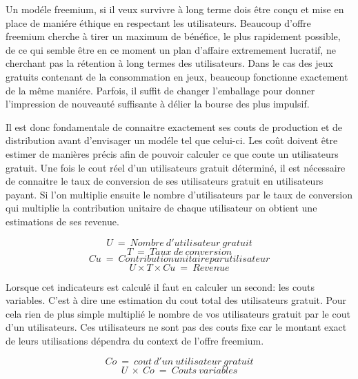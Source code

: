 \documentclass[11pt, a4paper ]{article}
\begin{document}
Un modéle freemium, si il veux survivre à long terme dois être conçu et mise en place de maniére éthique\cite{ethicalF2P} en respectant les utilisateurs. Beaucoup d'offre freemium cherche à tirer un maximum de bénéfice, le plus rapidement possible, de ce qui semble être en ce moment un plan d'affaire extremement lucratif, ne cherchant pas la rétention à long termes des utilisateurs. Dans le cas des jeux gratuits contenant de la consommation en jeux, beaucoup fonctionne exactement de la même maniére. Parfois, il suffit de changer l'emballage pour donner l'impression de nouveauté suffisante à délier la bourse des plus impulsif. 

Il est donc fondamentale de connaitre exactement ses couts de production et de distribution avant d'envisager un modéle tel que celui-ci. Les coût doivent être estimer de manières précis afin de pouvoir calculer ce que coute un utilisateurs gratuit. Une fois le cout réel d'un utilisateurs gratuit déterminé, il est nécessaire de connaitre le taux de conversion de ses utilisateurs gratuit en utilisateurs payant. Si l'on multiplie ensuite le nombre d'utilisateurs par le taux de conversion qui multiplie la contribution unitaire de chaque utilisateur on obtient une estimations de ses revenue\cite{equationFreemium}.

\begin{equation}
	U\ =\ Nombre\ d'utilisateur\ gratuit
\end{equation}
\begin{equation}
	T\ =\ Taux\ de\ conversion
\end{equation}
\begin{equation}
	Cu\ =\ Contribution unitaire par utilisateur
\end{equation}
\begin{equation}
	U \times T \times Cu\ =\ Revenue
\end{equation}

Lorsque cet indicateurs est calculé il faut en calculer un second: les couts variables. C'est à dire une estimation du cout total des utilisateurs gratuit. Pour cela rien de plus simple multiplié le nombre de vos utilisateurs gratuit par le cout d'un utilisateurs. Ces utilisateurs ne sont pas des couts fixe car le montant exact de leurs utilisations dépendra du context de l'offre freemium.

\begin{equation}
	Co\ =\ cout\ d'un\ utilisateur\ gratuit
\end{equation}
\begin{equation}
	U\ \times\ Co\ =\ Couts\ variables
\end{equation}
\end{document}
